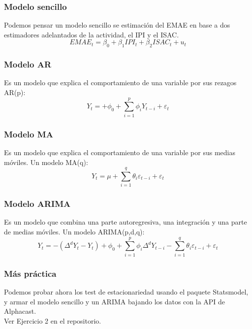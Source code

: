 \documentclass{beamer}
\begin{document}
\begin{frame}
\frametitle{Modelo sencillo}
\justify
Podemos pensar un modelo sencillo se estimación del EMAE en base a dos estimadores adelantados de la actividad, el IPI y el ISAC.\\
\vspace{5mm} %
\[
EMAE_t=\beta_0+\beta_1IPI_t+\beta_2ISAC_t+u_t
\]
\end{frame}

\begin{frame}
\frametitle{Modelo AR}
\justify
Es un modelo que explica el comportamiento de una variable por sus rezagos AR(p): \\
\vspace{5mm} %
\[
{\displaystyle Y_{t}=+\phi _{0}+\sum _{i=1}^{p}\phi _{i}Y_{t-i}+\varepsilon _{t}}
\]
\end{frame}

\begin{frame}
\frametitle{Modelo MA}
\justify
Es un modelo que explica el comportamiento de una variable por sus medias móviles. Un modelo MA(q): \\
\vspace{5mm} %
\[
{\displaystyle Y_{t}=\mu +\sum _{i=1}^{q}\theta _{i}\varepsilon _{t-i}+\varepsilon _{t}}
\]
\end{frame}


\begin{frame}
\frametitle{Modelo ARIMA}
\justify
Es un modelo que combina una parte autoregresiva, una integración y una parte de medias móviles. Un modelo ARIMA(p,d,q): \\
\vspace{5mm} %
\[
{\displaystyle Y_{t}=-(\Delta ^{d}Y_{t}-Y_{t})+\phi _{0}+\sum _{i=1}^{p}\phi _{i}\Delta ^{d}Y_{t-i}-\sum _{i=1}^{q}\theta _{i}\varepsilon _{t-i}+\varepsilon _{t}}
\]
\end{frame}

\begin{frame}

\frametitle{Más práctica}
Podemos probar ahora los test de estacionariedad usando el paquete Statsmodel, y armar el modelo sencillo y un ARIMA bajando los datos con la API de Alphacast.\\ 

\vspace{5mm} %
Ver Ejercicio 2 en el repositorio.\\
\end{frame}
\end{document}

